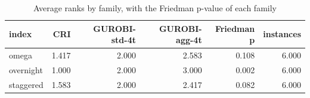 \begin{table}[htbp]
\centering
\small
\caption{Average ranks by family, with the Friedman p-value of each family}
\label{tab:E7_gurobi_threads_b60_ranks_by_family}
\begin{tabular}{lrrrrr}
\toprule
index & CRI & GUROBI-std-4t & GUROBI-agg-4t & Friedman p & instances \\
\midrule
omega & 1.417 & 2.000 & 2.583 & 0.108 & 6.000 \\
overnight & 1.000 & 2.000 & 3.000 & 0.002 & 6.000 \\
staggered & 1.583 & 2.000 & 2.417 & 0.082 & 6.000 \\
\bottomrule
\end{tabular}
\end{table}
